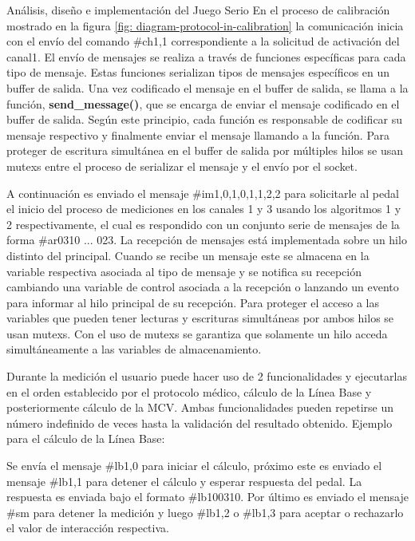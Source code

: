\begin{thesischapter}{2} {Análisis, diseño e implementación del Juego Serio}
    \vspace{100pt}   
    En el proceso de calibración mostrado en la figura \ref{fig: diagram-protocol-in-calibration} 
    la comunicación inicia con el envío del comando \#ch1,1 
    correspondiente a la solicitud de activación  del canal1. El envío de mensajes se realiza 
    a través de funciones específicas para cada tipo de mensaje.
    Estas funciones serializan tipos de mensajes específicos en un buffer de salida. Una vez
    codificado el mensaje en el buffer de salida, se llama a la función,
    \textbf{send\_message()}, que se encarga de enviar el mensaje codificado en el buffer
    de salida. Según este principio, cada función es responsable de codificar su mensaje
    respectivo y finalmente enviar el mensaje llamando a la función. Para proteger
    de escritura simultánea en el buffer de salida por múltiples hilos se usan mutexs entre el
    proceso de serializar el mensaje y el envío por el socket. 
    
    \vspace{10pt}
    A continuación es enviado el mensaje \#im1,0,1,0,1,1,2,2 para solicitarle al pedal el inicio 
    del proceso de mediciones en los canales 1 y 3 usando los algoritmos 1 y 2 respectivamente, el 
    cual es respondido con un conjunto serie de mensajes de la forma \#ar0310 ... 023. La recepción 
    de mensajes está implementada sobre un hilo distinto del principal. Cuando se 
    recibe un mensaje este se almacena en la variable respectiva
    asociada al tipo de mensaje y se notifica su recepción cambiando una variable de control
    asociada a la recepción o lanzando un evento para informar al hilo principal de su
    recepción. Para proteger el acceso a las variables que pueden tener lecturas y escrituras
    simultáneas por ambos hilos se usan mutexs. Con el uso de mutexs se garantiza que
    solamente un hilo acceda simultáneamente a las variables de almacenamiento. 

    \vspace{10pt}
    Durante la medición el usuario puede hacer uso de 2 funcionalidades y ejecutarlas en el orden 
    establecido por el protocolo médico, cálculo de la Línea Base y posteriormente cálculo de la MCV.
    Ambas funcionalidades pueden repetirse un número indefinido de veces hasta la validación del resultado 
    obtenido. Ejemplo para el cálculo de la Línea Base:
    
    \vspace{10pt}
    Se envía el mensaje \#lb1,0 para iniciar el cálculo, próximo este es enviado el mensaje  \#lb1,1 para 
    detener el cálculo y esperar respuesta del pedal. La respuesta es enviada bajo el formato  \#lb100310. 
    Por último es enviado el mensaje \#sm para detener la medición y luego \#lb1,2 o \#lb1,3 para aceptar 
     o rechazarlo el valor de interacción respectiva.  


\end{thesischapter}
